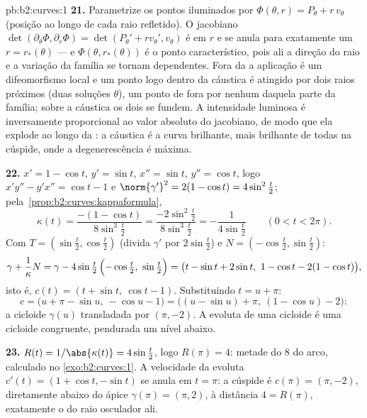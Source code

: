 \begin{solution}{pb:b2:curves:1}
\textbf{21.} Parametrize os pontos iluminados por
$\Phi(\theta, r) = P_\theta + r\,v_\theta$ (posição ao longo
de cada raio refletido). O  jacobiano
$\det(\partial_\theta\Phi, \partial_r\Phi) =
\det(P_\theta' + rv_\theta', v_\theta)$ é  em $r$ e
se anula para exatamente um $r = r_*(\theta)$ --- e
$\Phi(\theta, r_*(\theta))$ é o ponto característico, pois
ali a direção do raio e a variação da família se tornam
dependentes. Fora da  a aplicação é um difeomorfismo local
e um ponto logo dentro da cáustica é atingido por dois raios
próximos (duas soluções $\theta$), um ponto de fora por nenhum daquela
parte da família; sobre a cáustica os dois se fundem. A
intensidade luminosa é inversamente proporcional ao valor absoluto
do jacobiano, de modo que ela explode ao longo da : a cáustica é a
curva brilhante, mais brilhante de todas na cúspide, onde a
degenerescência é máxima.

\textbf{22.} $x' = 1 - \cos t$, $y' = \sin t$, $x'' = \sin
t$, $y'' = \cos t$, logo $x'y'' - y'x'' = \cos t - 1$ e
$\norm{\gamma'}^2 = 2(1 - \cos t) = 4\sin^2\tfrac t2$;
pela~\cref{prop:b2:curves:kappaformula},
\[
\kappa(t) = \frac{-(1 - \cos t)}{8\sin^3\tfrac t2}
= \frac{-2\sin^2\tfrac t2}{8\sin^3\tfrac t2}
= -\frac1{4\sin\tfrac t2}
\qquad (0 < t < 2\pi).
\]
Com $T = (\sin\tfrac t2, \cos\tfrac t2)$ (divida $\gamma'$
por $2\sin\tfrac t2$) e $N = (-\cos\tfrac t2, \sin\tfrac
t2)$:
\[
\gamma + \frac1\kappa N
= \gamma - 4\sin\tfrac t2\,\Bigl(-\cos\tfrac t2,\
\sin\tfrac t2\Bigr)
= \bigl(t - \sin t + 2\sin t,\ 1 - \cos t - 2(1 - \cos
t)\bigr),
\]
isto é, $c(t) = (t + \sin t,\ \cos t - 1)$. Substituindo $t = u
+ \pi$:
\[
c = \bigl(u + \pi - \sin u,\ -\cos u - 1\bigr)
= \bigl((u - \sin u) + \pi,\ (1 - \cos u) - 2\bigr) :
\]
a cicloide $\gamma(u)$ transladada por $(\pi, -2)$. A
evoluta de uma cicloide é uma cicloide congruente, pendurada um
nível abaixo.

\textbf{23.} $R(t) = 1/\abs{\kappa(t)} = 4\sin\tfrac t2$, logo
$R(\pi) = 4$: metade do  $8$ do arco, calculado no
\cref{exo:b2:curves:1}. A velocidade da evoluta $c'(t) = (1 +
\cos t, -\sin t)$ se anula em $t = \pi$: a cúspide é $c(\pi)
= (\pi, -2)$, diretamente abaixo do ápice $\gamma(\pi) = (\pi,
2)$, à distância $4 = R(\pi)$, exatamente o  do
raio osculador ali.


\end{solution}
